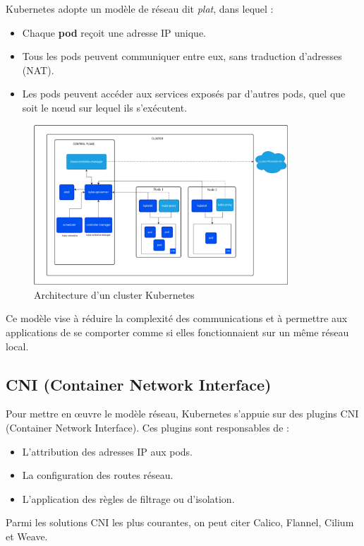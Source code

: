 Kubernetes adopte un modèle de réseau dit \emph{plat}, dans lequel :
\begin{itemize}
	\item Chaque \textbf{pod} reçoit une adresse IP unique.
	\item Tous les pods peuvent communiquer entre eux, sans traduction d’adresses (NAT).
	\item Les pods peuvent accéder aux services exposés par d’autres pods, quel que soit le nœud sur lequel ils s’exécutent.
\end{itemize}
\begin{figure}[H]
	\centering
	\includegraphics[width=0.85\textwidth]{figures/kubernetes-cluster-architecture.png}
	\caption{Architecture d'un cluster Kubernetes}
\end{figure}
Ce modèle vise à réduire la complexité des communications et à permettre aux applications de se comporter comme si elles fonctionnaient sur un même réseau local.

\subsection{CNI (Container Network Interface)}

Pour mettre en œuvre le modèle réseau, Kubernetes s’appuie sur des plugins CNI (Container Network Interface).
Ces plugins sont responsables de :
\begin{itemize}
	\item L’attribution des adresses IP aux pods.
	\item La configuration des routes réseau.
	\item L’application des règles de filtrage ou d’isolation.
\end{itemize}
Parmi les solutions CNI les plus courantes, on peut citer Calico, Flannel, Cilium et Weave.

